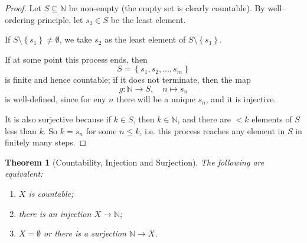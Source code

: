 \documentclass{article}
\newtheorem{theorem}{Theorem}[section]
\theoremstyle{definition}
\theoremstyle{remark}
\newcommand{\Bqty}[1]{\left\{#1\right\}}
\newcommand{\function}[5]{#1:#2\to #3,\quad #4\mapsto #5}
\newcommand{\NN}{\mathbb{N}}
\begin{document}
\begin{proof}
    Let \(S \subseteq \NN\) be non-empty (the empty set is clearly countable). By well--ordering principle, let \(s_1 \in S\) be the least element.

    If \(S \setminus \Bqty{s_1} \neq \emptyset\), we take \(s_2\) as the least element of \(S \setminus \Bqty{s_1}\).

    If at some point this process ends, then
    \[
        S = \Bqty{s_1, s_2, \ldots, s_m}
    \]
    is finite and hence countable; if it does not terminate, then the map
    \[
        \function{g}{\NN}{S}{n}{s_n}
    \]
    is well-defined, since for eny \(n\) there will be a unique \(s_n\), and it is injective.

    It is also surjective because if \(k \in S\), then \(k \in \NN\), and there are \(< k\) elements of \(S\) less than \(k\). So \(k = s_n\) for some \(n \leq k\), i.e. this process reaches any element in \(S\) in finitely many steps.
\end{proof}

\begin{theorem}[Countability, Injection and Surjection]
    The following are equivalent:
    \begin{enumerate}
        \item \(X\) is countable;
        \item there is an injection \(X \to \NN\);
        \item \(X = \emptyset\) or there is a surjection \(\NN \to X\).
    \end{enumerate}
\end{theorem}
\end{document}
